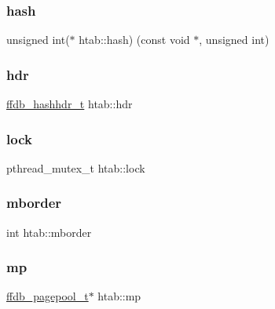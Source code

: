 \subsubsection{\texorpdfstring{hash}{hash}}
{\footnotesize\ttfamily unsigned int($\ast$ htab\+::hash) (const void $\ast$, unsigned int)}

\mbox{\label{structhtab_ace908dbb78be497aeb76124ebf0e26b5}} 
\subsubsection{\texorpdfstring{hdr}{hdr}}
{\footnotesize\ttfamily \mbox{\hyperlink{ffdb__hash_8h_aab0f28f6f6872895710d2edc192c8d3a}{ffdb\+\_\+hashhdr\+\_\+t}} htab\+::hdr}

\mbox{\label{structhtab_a74c24a124724588e43ed76d6dea81b74}} 
\subsubsection{\texorpdfstring{lock}{lock}}
{\footnotesize\ttfamily pthread\+\_\+mutex\+\_\+t htab\+::lock}

\mbox{\label{structhtab_a3d3e7570e07708a89d0e835609310464}} 
\subsubsection{\texorpdfstring{mborder}{mborder}}
{\footnotesize\ttfamily int htab\+::mborder}

\mbox{\label{structhtab_ac6813e280d41ce4bb7641ffea6ec9065}} 
\subsubsection{\texorpdfstring{mp}{mp}}
{\footnotesize\ttfamily \mbox{\hyperlink{ffdb__pagepool_8h_a73290f737b0e5f8be90a0fa96ddf6ab6}{ffdb\+\_\+pagepool\+\_\+t}}$\ast$ htab\+::mp}

\mbox{\label{structhtab_ac52b8a6b13ecefc3a22bc34cc6086765}} 
